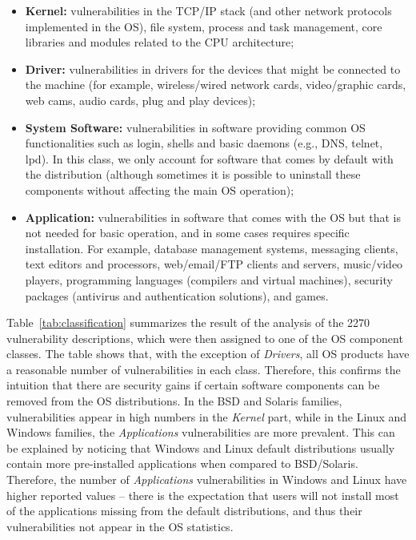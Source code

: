 \begin{itemize}

\item \textbf{Kernel:} vulnerabilities in the TCP/IP stack (and other network protocols implemented in the OS), file system, process and task management, core libraries and modules related to the CPU architecture;

\item \textbf{Driver:} vulnerabilities in drivers for the devices that might be connected to the machine (for example, wireless/wired network cards, video/graphic cards, web cams, audio cards, plug and play devices);

\item \textbf{System Software:} vulnerabilities in software providing common OS functionalities such as login, shells and basic daemons (e.g., DNS, telnet, lpd). In this class, we only account for software that comes by default with the distribution (although sometimes it is possible to uninstall these components without affecting the main OS operation);

\item \textbf{Application:} vulnerabilities in software that comes with the OS but that is not needed for basic operation, and in some cases requires specific installation. For example, database management systems, messaging clients, text editors and processors, web/email/FTP clients and servers, music/video players, programming languages (compilers and virtual machines), security packages (antivirus and authentication solutions), and games.
\end{itemize}


Table~\ref{tab:classification} summarizes the result of the analysis of the 2270 vulnerability descriptions, which were then assigned to one of the OS component classes. The table shows that, with the exception of \textit{Drivers}, all OS products have a reasonable number of vulnerabilities in each class.  Therefore, this confirms the intuition that there are security gains if certain software components can be removed from the OS distributions. In the BSD and Solaris families, vulnerabilities appear in high numbers in the \textit{Kernel} part, while in the Linux and Windows families, the \textit{Applications} vulnerabilities are more prevalent. This can be explained by noticing that Windows and Linux default distributions usually contain more pre-installed applications when compared to BSD/Solaris. Therefore, the number of \textit{Applications} vulnerabilities in Windows and Linux have higher reported values -- there is the expectation that users will not install most of the applications missing from  the default distributions, and thus their vulnerabilities not appear in the OS statistics.



